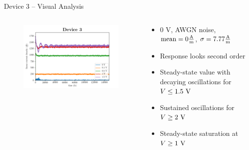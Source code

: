 \documentclass{beamer}
\begin{document}
\begin{frame}{Device 3 -- Visual Analysis}

\begin{columns}
\begin{column}{0.5\textwidth}
\begin{figure}
    \centering
    \includegraphics[scale=0.35]{Figures/Device_3/0_to_1_5.png}
    \label{fig:dev_3_1}
\end{figure}{}
\end{column}

\begin{column}{0.5\textwidth}
\begin{itemize}
    \item 0 V, AWGN noise, $\textnormal{mean} = 0 \frac{\textnormal{A}}{\textnormal{m}}$, $\sigma = 7.77 \frac{\textnormal{A}}{\textnormal{m}}$
    \item Response looks second order
    \item Steady-state value with decaying oscillations for $V \leq 1.5 \textnormal{ V}$
    \item Sustained oscillations for $V \geq 2 \textnormal{ V}$
    \item Steady-state saturation at $V \geq 1 \textnormal{ V}$
\end{itemize}
\end{column}
\end{columns}

\end{frame}
\end{document}
